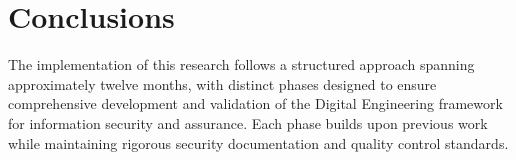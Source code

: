\chapter{\leavevmode\newline Conclusions}\label{chap:Chapter_5}

The implementation of this research follows a structured approach spanning approximately twelve months, with distinct phases designed to ensure comprehensive development and validation of the Digital Engineering framework for information security and assurance. Each phase builds upon previous work while maintaining rigorous security documentation and quality control standards.

